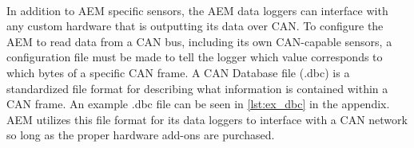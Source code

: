 \paragraph{}
In addition to AEM specific sensors, the AEM data loggers can interface with any custom hardware that is outputting its data over CAN.
To configure the AEM to read data from a CAN bus, including its own CAN-capable sensors, a configuration file must be made to tell the logger which value corresponds to which bytes of a specific CAN frame.
A CAN Database file (.dbc) is a standardized file format for describing what information is contained within a CAN frame.
An example .dbc file can be seen in \cref{lst:ex_dbc} in the appendix.
AEM utilizes this file format for its data loggers to interface with a CAN network so long as the proper hardware add-ons are purchased.